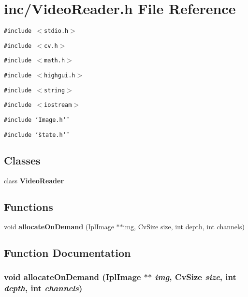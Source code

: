 \section{inc/VideoReader.h File Reference}
\label{VideoReader_8h}
{\tt \#include $<$stdio.h$>$}\par
{\tt \#include $<$cv.h$>$}\par
{\tt \#include $<$math.h$>$}\par
{\tt \#include $<$highgui.h$>$}\par
{\tt \#include $<$string$>$}\par
{\tt \#include $<$iostream$>$}\par
{\tt \#include \char`\"{}Image.h\char`\"{}}\par
{\tt \#include \char`\"{}state.h\char`\"{}}\par
\subsection*{Classes}
\begin{CompactItemize}
\item 
class {\bf VideoReader}
\end{CompactItemize}
\subsection*{Functions}
\begin{CompactItemize}
\item 
void {\bf allocateOnDemand} (IplImage $\ast$$\ast$img, CvSize size, int depth, int channels)
\end{CompactItemize}


\subsection{Function Documentation}
\subsubsection{\setlength{\rightskip}{0pt plus 5cm}void allocateOnDemand (IplImage $\ast$$\ast$ {\em img}, CvSize {\em size}, int {\em depth}, int {\em channels})}\label{VideoReader_8h_66fc830815e9f0a92413aac31cca7c6e}


